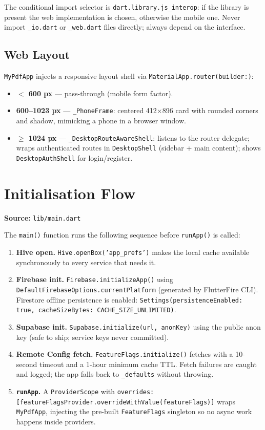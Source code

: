 \documentclass[11pt,a4paper]{article}
\begin{document}
The conditional import selector is \texttt{dart.library.js\_interop}: if the library is
present the web implementation is chosen, otherwise the mobile one. Never import
\texttt{\_io.dart} or \texttt{\_web.dart} files directly; always depend on the interface.

\subsection{Web Layout}

\texttt{MyPdfApp} injects a responsive layout shell via
\texttt{MaterialApp.router(builder:)}:

\begin{itemize}
  \item \textbf{$<$ 600 px} --- pass-through (mobile form factor).
  \item \textbf{600--1023 px} --- \texttt{\_PhoneFrame}: centered 412$\times$896
    card with rounded corners and shadow, mimicking a phone in a browser window.
  \item \textbf{$\geq$ 1024 px} --- \texttt{\_DesktopRouteAwareShell}: listens to the
    router delegate; wraps authenticated routes in \texttt{DesktopShell}
    (sidebar + main content); shows \texttt{DesktopAuthShell} for login/register.
\end{itemize}

\section{Initialisation Flow}

\textbf{Source:} \texttt{lib/main.dart}

The \texttt{main()} function runs the following sequence before
\texttt{runApp()} is called:

\begin{enumerate}
  \item \textbf{Hive open.} \texttt{Hive.openBox('app\_prefs')} makes the local cache
    available synchronously to every service that needs it.
  \item \textbf{Firebase init.} \texttt{Firebase.initializeApp()} using
    \texttt{DefaultFirebaseOptions.currentPlatform} (generated by FlutterFire CLI).
    Firestore offline persistence is enabled:
    \texttt{Settings(persistenceEnabled: true, cacheSizeBytes:\,CACHE\_SIZE\_UNLIMITED)}.
  \item \textbf{Supabase init.} \texttt{Supabase.initialize(url, anonKey)} using the
    public anon key (safe to ship; service keys never committed).
  \item \textbf{Remote Config fetch.} \texttt{FeatureFlags.initialize()} fetches with a
    10-second timeout and a 1-hour minimum cache TTL. Fetch failures are caught and
    logged; the app falls back to \texttt{\_defaults} without throwing.
  \item \textbf{\texttt{runApp}.} A \texttt{ProviderScope} with
    \texttt{overrides:\,[featureFlagsProvider.overrideWithValue(featureFlags)]} wraps
    \texttt{MyPdfApp}, injecting the pre-built \texttt{FeatureFlags} singleton so no
    async work happens inside providers.
\end{enumerate}
\end{document}
